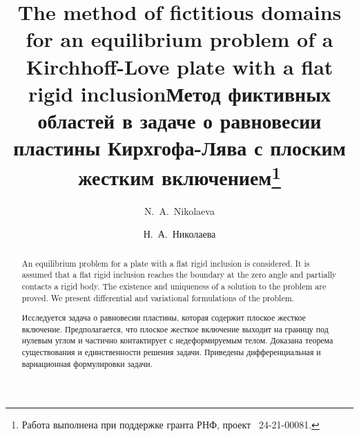 \begin{englishtitle}
\title{The method of fictitious domains for an equilibrium problem of a Kirchhoff-Love plate with a flat rigid inclusion}
\author{N.~A.~Nikolaeva}

\maketitle

\begin{abstract}
An equilibrium problem for a plate with a flat rigid inclusion is considered. It is assumed that a flat rigid inclusion reaches the boundary at the zero angle and partially contacts a rigid body. The existence and uniqueness of a solution to the problem are proved.
We present differential and variational formulations of the problem. 

\end{abstract}
\end{englishtitle}



\iffalse
\documentclass[12pt]{llncs}
\usepackage[T2A]{fontenc}
\usepackage[utf8]{inputenc}
\usepackage[english,russian]{babel}
\usepackage[russian]{nla}




\fi

\title{Метод фиктивных областей в задаче о равновесии пластины Кирхгофа-Лява с плоским жестким включением\thanks{Работа выполнена при поддержке гранта РНФ, проект \textnumero~24-21-00081.}}
\author{Н.~А.~Николаева
} %

\maketitle

\begin{abstract}
Исследуется задача о равновесии пластины, которая содержит плоское жесткое включение. Предполагается, что плоское жесткое включение выходит на границу под нулевым углом и частично контактирует с недеформируемым телом. Доказана теорема существования и единственности решения задачи. Приведены дифференциальная и вариационная формулировки задачи. 

\end{abstract}

